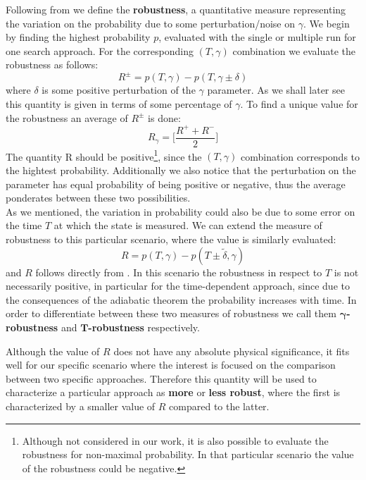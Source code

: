         Following from \cite{SH.HungS.Hietala2019} we define the \textbf{robustness}, a quantitative measure representing the variation on the probability due to some perturbation/noise on $\gamma$.
        We begin by finding the highest probability $p$, evaluated with the single or multiple run for one search approach. For the corresponding $(T,\gamma)$ combination we evaluate the robustness as follows:
        \begin{equation}
            R ^\pm = p(T, \gamma) - p(T, \gamma \pm \delta)
        \end{equation}
        where $\delta$ is some positive perturbation of the $\gamma$ parameter. As we shall later see this quantity is given in terms of some percentage of $\gamma$. To find a unique value for the robustness an average of $R^\pm$ is done:
        \begin{equation}
            R_\gamma = \bigg[\frac{R^++ R^-}{2}\bigg]
            \label{eq:robustness}
        \end{equation}
        The quantity R should be positive\footnote{ Although not considered in our work, it is also possible to evaluate the robustness for non-maximal probability. In that particular scenario the value of the robustness could be negative.}, since the $(T,\gamma)$ combination corresponds to the hightest probability. Additionally we also notice that the perturbation on the parameter has equal probability of being positive or negative, thus the average ponderates between these two possibilities. \\

        \noindent
        As we mentioned, the variation in probability could also be due to some error on the time $T$ at which the state is measured. We can extend the measure of robustness to this particular scenario, where the value is similarly evaluated:
        \begin{equation}
            R = p(T, \gamma) - p(T \pm \tilde{\delta}, \gamma )
        \end{equation}
        and $R$ follows directly from . In this scenario the robustness in respect to $T$ is not necessarily positive, in particular for the time-dependent approach, since due to the consequences of the adiabatic theorem the probability increases with time.
        In order to differentiate between these two measures of robustness we call them \textbf{$\bm{\gamma}$-robustness} and \textbf{$\bm{T}$-robustness} respectively.


        Although the value of $R$ does not have any absolute physical significance, it fits well for our specific scenario where the interest is focused on the comparison between two specific approaches. Therefore this quantity will be used to characterize a particular approach as \textbf{more} or \textbf{less robust}, where the first is characterized by a smaller value of $R$ compared to the latter.

